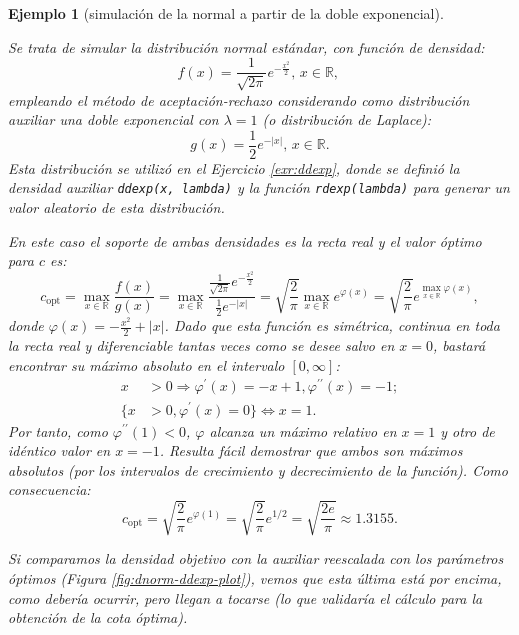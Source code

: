 \documentclass[
]{book}
\theoremstyle{break}
\newtheorem{example}{Ejemplo}[chapter]
\theoremstyle{nonumberplain}
\begin{document}
\begin{example}[simulación de la normal a partir de la doble exponencial]
\protect\hypertarget{exm:dnorm-ddexp-ar}{}\label{exm:dnorm-ddexp-ar}

Se trata de simular la distribución normal estándar, con función de densidad:
\[f(x)  =\frac{1}{\sqrt{2\pi}}e^{-\frac{x^{2}}{2}} \text{, } x\in\mathbb{R}\text{, }\]
empleando el método de aceptación-rechazo considerando como distribución auxiliar una doble exponencial con \(\lambda=1\) (o distribución de Laplace):
\[g(x)  =\frac{1}{2}e^{-\left| x \right|} \text{, } x\in\mathbb{R}.\]
Esta distribución se utilizó en el Ejercicio \ref{exr:ddexp}, donde se definió la densidad auxiliar \texttt{ddexp(x,\ lambda)} y la función \texttt{rdexp(lambda)} para generar un valor aleatorio de esta distribución.

En este caso el soporte de ambas densidades es la recta real y el valor óptimo para \(c\) es:
\[c_{\text{opt}} = \max_{x\in\mathbb{R}}\frac{f(x)}{g(x) } = \max_{x\in\mathbb{R}} \frac{\frac{1}{\sqrt{2\pi}}e^{-\frac{x^{2}}{2}}}{\frac{1}{2}e^{-\left| x\right|  }} = \sqrt{\frac{2}{\pi}}\max_{x\in\mathbb{R}}e^{\varphi(x)} = \sqrt{\frac{2}{\pi}}e^{\max_{x\in\mathbb{R}}\varphi(x)},\]
donde \(\varphi(x) = -\frac{x^{2}}{2}+\left| x \right|\).
Dado que esta función es simétrica, continua en toda la recta real y diferenciable tantas veces como se desee salvo en \(x=0\), bastará encontrar su máximo absoluto en el intervalo \([0,\infty]\):
\[\begin{aligned}
x  & >0\Rightarrow\varphi^{\prime}(x)  =-x+1,\varphi
^{\prime\prime}(x)  =-1;\\
\{x  & >0,\varphi^{\prime}(x)  =0\}\Leftrightarrow x=1.
\end{aligned}\]
Por tanto, como \(\varphi^{\prime\prime}(1) <0\), \(\varphi\) alcanza un máximo relativo en \(x=1\) y otro de idéntico valor en \(x=-1\).
Resulta fácil demostrar que ambos son máximos absolutos
(por los intervalos de crecimiento y decrecimiento de la función).
Como consecuencia:
\[c_{\text{opt}} = \sqrt{\frac{2}{\pi}}e^{\varphi(1)}
=\sqrt{\frac{2}{\pi}}e^{1/2} =\sqrt{\frac{2e}{\pi}} \approx 1.3155.\]

Si comparamos la densidad objetivo con la auxiliar reescalada con los parámetros óptimos (Figura \ref{fig:dnorm-ddexp-plot}), vemos que esta última está por encima, como debería ocurrir, pero llegan a tocarse (lo que validaría el cálculo para la obtención de la cota óptima).


\end{example}
\end{document}
